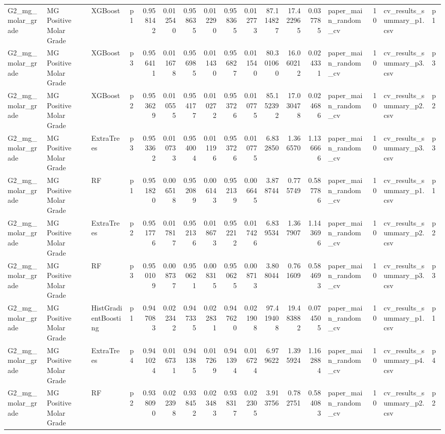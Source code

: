 \begin{tabular}{llllrrrrrrrrrlrll}
G2_mg_molar_grade & MG Positive Molar Grade & XGBoost & p1 & 0.958142 & 0.012540 & 0.958635 & 0.012290 & 0.958365 & 0.012773 & 87.114827 & 17.422965 & 0.037785 & paper_main_random_cv & 10 & cv_results_summary_p1.csv & p1 \\
G2_mg_molar_grade & MG Positive Molar Grade & XGBoost & p3 & 0.956411 & 0.011678 & 0.956985 & 0.011430 & 0.956827 & 0.011540 & 80.301060 & 16.060212 & 0.024331 & paper_main_random_cv & 10 & cv_results_summary_p3.csv & p3 \\
G2_mg_molar_grade & MG Positive Molar Grade & XGBoost & p2 & 0.953629 & 0.010555 & 0.954177 & 0.010272 & 0.953726 & 0.010775 & 85.152392 & 17.030478 & 0.024686 & paper_main_random_cv & 10 & cv_results_summary_p2.csv & p2 \\
G2_mg_molar_grade & MG Positive Molar Grade & ExtraTrees & p3 & 0.953362 & 0.010733 & 0.954004 & 0.011196 & 0.953726 & 0.010775 & 6.832850 & 1.366570 & 1.136666 & paper_main_random_cv & 10 & cv_results_summary_p3.csv & p3 \\
G2_mg_molar_grade & MG Positive Molar Grade & RF & p1 & 0.951820 & 0.006518 & 0.952089 & 0.006143 & 0.952139 & 0.006645 & 3.878744 & 0.775749 & 0.587786 & paper_main_random_cv & 10 & cv_results_summary_p1.csv & p1 \\
G2_mg_molar_grade & MG Positive Molar Grade & ExtraTrees & p2 & 0.951776 & 0.017817 & 0.952136 & 0.018673 & 0.952212 & 0.017426 & 6.839534 & 1.367907 & 1.143696 & paper_main_random_cv & 10 & cv_results_summary_p2.csv & p2 \\
G2_mg_molar_grade & MG Positive Molar Grade & RF & p3 & 0.950109 & 0.008737 & 0.950621 & 0.008315 & 0.950625 & 0.008713 & 3.808044 & 0.761609 & 0.584693 & paper_main_random_cv & 10 & cv_results_summary_p3.csv & p3 \\
G2_mg_molar_grade & MG Positive Molar Grade & HistGradientBoosting & p1 & 0.947083 & 0.022342 & 0.947335 & 0.022831 & 0.947620 & 0.021908 & 97.419408 & 19.483882 & 0.074505 & paper_main_random_cv & 10 & cv_results_summary_p1.csv & p1 \\
G2_mg_molar_grade & MG Positive Molar Grade & ExtraTrees & p4 & 0.941024 & 0.016731 & 0.941385 & 0.017269 & 0.941394 & 0.016724 & 6.979622 & 1.395924 & 1.162884 & paper_main_random_cv & 10 & cv_results_summary_p4.csv & p4 \\
G2_mg_molar_grade & MG Positive Molar Grade & RF & p2 & 0.938090 & 0.022398 & 0.938452 & 0.023483 & 0.938317 & 0.022305 & 3.913756 & 0.782751 & 0.584083 & paper_main_random_cv & 10 & cv_results_summary_p2.csv & p2 \\

\end{tabular}
